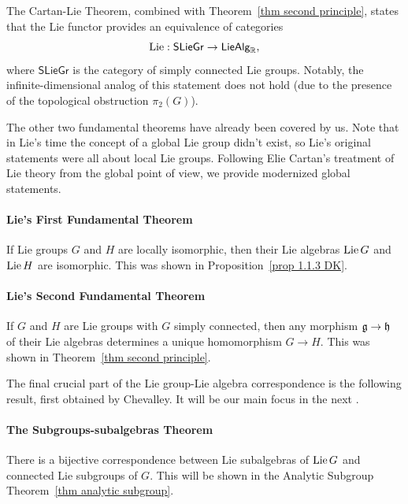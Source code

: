 \begin{rem}
    The Cartan-Lie Theorem, combined with Theorem~\ref{thm second principle}, states that the Lie functor provides an equivalence of categories
    \[\operatorname{Lie}:\mathsf{SLieGr}\to \mathsf{LieAlg}_{\mathbb{R}},\]
    where $\mathsf{SLieGr}$ is the category of simply connected Lie groups. Notably, the infinite-dimensional analog of this statement does not hold (due to the presence of the topological obstruction $\pi_2(G)$).

    The other two fundamental theorems have already been covered by us. Note that in Lie's time the concept of a global Lie group didn't exist, so Lie's original statements were all about local Lie groups. Following Elie Cartan's treatment of Lie theory from the global point of view, we provide modernized global statements.

    \paragraph{Lie's First Fundamental Theorem} If Lie groups $G$ and $H$ are locally isomorphic, then their Lie algebras $\operatorname{Lie} G$ and $\operatorname{Lie} H$ are isomorphic. This was shown in Proposition~\ref{prop 1.1.3 DK}.

    \paragraph{Lie's Second Fundamental Theorem} If $G$ and $H$ are Lie groups with $G$ simply connected, then any morphism $\mathfrak{g}\to\mathfrak{h}$ of their Lie algebras determines a unique homomorphism $G\to H$. This was shown in Theorem~\ref{thm second principle}.
    
    The final crucial part of the Lie group-Lie algebra correspondence is the following result, first obtained by Chevalley. It will be our main focus in the next \subsect.

    \paragraph{The Subgroups-subalgebras Theorem} There is a bijective correspondence between Lie subalgebras of $\operatorname{Lie} G$ and connected Lie subgroups of $G$. This will be shown in the Analytic Subgroup Theorem~\ref{thm analytic subgroup}.
\end{rem}


